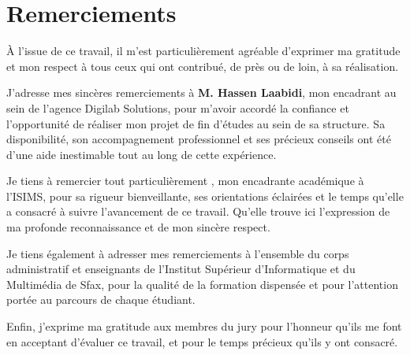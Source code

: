 \chapter*{Remerciements}
\thispagestyle{plain}

\noindent À l'issue de ce travail, il m'est particulièrement agréable d'exprimer ma gratitude et mon respect à tous ceux qui ont contribué, de près ou de loin, à sa réalisation.

\vspace{0.6cm}

\noindent J'adresse mes sincères remerciements à \textbf{M. Hassen Laabidi}, mon encadrant au sein de l'agence Digilab Solutions, pour m'avoir accordé la confiance et l'opportunité de réaliser mon projet de fin d'études au sein de sa structure. Sa disponibilité, son accompagnement professionnel et ses précieux conseils ont été d'une aide inestimable tout au long de cette expérience.

\vspace{0.6cm}

\noindent Je tiens à remercier tout particulièrement \textbf{\NomEncadrante}, mon encadrante académique à l'ISIMS, pour sa rigueur bienveillante, ses orientations éclairées et le temps qu'elle a consacré à suivre l'avancement de ce travail. Qu'elle trouve ici l'expression de ma profonde reconnaissance et de mon sincère respect.

\vspace{0.6cm}

\noindent Je tiens également à adresser mes remerciements à l'ensemble du corps administratif et enseignants de l'Institut Supérieur d'Informatique et du Multimédia de Sfax, pour la qualité de la formation dispensée et pour l'attention portée au parcours de chaque étudiant.

\vspace{0.6cm}

\noindent Enfin, j'exprime ma gratitude aux membres du jury pour l'honneur qu'ils me font en acceptant d'évaluer ce travail, et pour le temps précieux qu'ils y ont consacré.
